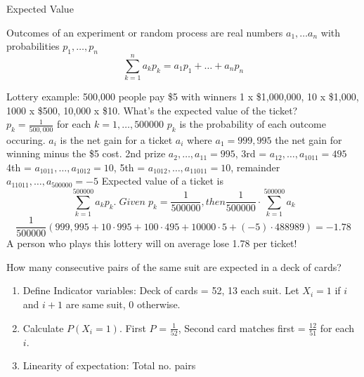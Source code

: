 \newcommand{\Exp}{\mathbb{E}}

\begin{definition}
    Expected Value
\end{definition}
Outcomes of an experiment or random process are real numbers $a_1, \dots a_n$ with probabilities $p_1, \dots, p_n$
\[ 
    \sum_{k=1}^{n} a_kp_k = a_1p_1 + \dots + a_np_n
\]

\begin{example}
Lottery example: 500,000 people pay \$5 with winners 1 x \$1,000,000, 10 x \$1,000, 1000 x \$500, 10,000 x \$10. What's the expected value of the ticket? \\
$p_k = \frac{1}{500,000}$ for each $k = 1, \dots, 500000$ $p_k$ is the probability of each outcome occuring. $a_i$ is the net gain for a ticket $a_i$ where $a_1 = 999,995$ the net gain for winning minus the \$5 cost. 
2nd prize $a_2, \dots, a_{11} = 995$, 3rd = $a_{12}, \dots, a_{1011} = 495$ 4th = $a_{1011}, \dots, a_{1012} = 10$, 5th = $a_{1012}, \dots, a_{11011} = 10$, remainder $a_{11011}, \dots, a_{500000} = -5$
Expected value of a ticket is 
\[
    \sum_{k=1}^{500000} a_kp_k. \; Given \; p_k = \frac{1}{500000}, then \frac{1}{500000} \cdot \sum_{k=1}^{500000} a_k
\]
\[
    \frac{1}{500000}(999,995 + 10 \cdot 995 + 100 \cdot 495 + 10000 \cdot 5 + (-5) \cdot 488989) = -1.78
\]
A person who plays this lottery will on average lose 1.78 per ticket!
\end{example}


\begin{example}
    How many consecutive pairs of the same suit are expected in a deck of cards?
    \begin{enumerate}
        \item Define Indicator variables: Deck of cards = 52, 13 each suit. Let $X_i = 1$ if $i$ and $i+1$ are same suit, 0 otherwise.
        \item Calculate $P(X_i = 1)$. First $P$ = $\frac{1}{52}$, Second card matches first = $\frac{12}{51}$ for each $i$.
        \item Linearity of expectation: Total no. pairs
    \end{enumerate}

\end{example}

















